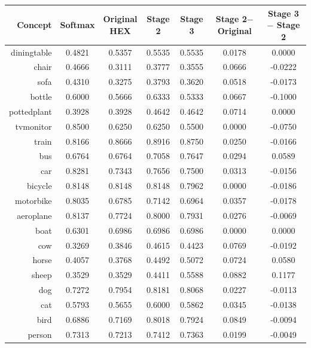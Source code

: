 \documentclass[11pt,a4paper]{article}
\begin{document}
\begin{table}[htbp]
\centering
\begin{tabular}{r|c|c|c|c|c|c}
Concept & Softmax & \makecell{Original\\HEX} & Stage 2 & Stage 3 & \makecell{Stage 2$-$\\Original} & \makecell{Stage 3$-$\\Stage 2}\\\hline
diningtable   & 0.4821 & 0.5357 & 0.5535 & 0.5535 & 0.0178 & 0.0000\\
chair         & 0.4666 & 0.3111 & 0.3777 & 0.3555 & 0.0666 & -0.0222\\
sofa          & 0.4310 & 0.3275 & 0.3793 & 0.3620 & 0.0518 & -0.0173\\
bottle        & 0.6000 & 0.5666 & 0.6333 & 0.5333 & 0.0667 & -0.1000\\
pottedplant   & 0.3928 & 0.3928 & 0.4642 & 0.4642 & 0.0714 & 0.0000\\
tvmonitor     & 0.8500 & 0.6250 & 0.6250 & 0.5500 & 0.0000 & -0.0750\\
train         & 0.8166 & 0.8666 & 0.8916 & 0.8750 & 0.0250 & -0.0166\\
bus           & 0.6764 & 0.6764 & 0.7058 & 0.7647 & 0.0294 & 0.0589\\
car           & 0.8281 & 0.7343 & 0.7656 & 0.7500 & 0.0313 & -0.0156\\
bicycle       & 0.8148 & 0.8148 & 0.8148 & 0.7962 & 0.0000 & -0.0186\\
motorbike     & 0.8035 & 0.6785 & 0.7142 & 0.6964 & 0.0357 & -0.0178\\
aeroplane     & 0.8137 & 0.7724 & 0.8000 & 0.7931 & 0.0276 & -0.0069\\
boat          & 0.6301 & 0.6986 & 0.6986 & 0.6986 & 0.0000 & 0.0000\\
cow           & 0.3269 & 0.3846 & 0.4615 & 0.4423 & 0.0769 & -0.0192\\
horse         & 0.4057 & 0.3768 & 0.4492 & 0.5072 & 0.0724 & 0.0580\\
sheep         & 0.3529 & 0.3529 & 0.4411 & 0.5588 & 0.0882 & 0.1177\\
dog           & 0.7272 & 0.7954 & 0.8181 & 0.8068 & 0.0227 & -0.0113\\
cat           & 0.5793 & 0.5655 & 0.6000 & 0.5862 & 0.0345 & -0.0138\\
bird          & 0.6886 & 0.7169 & 0.8018 & 0.7924 & 0.0849 & -0.0094\\
person        & 0.7313 & 0.7213 & 0.7412 & 0.7363 & 0.0199 & -0.0049\\\hline

\end{tabular}
\end{table}
\end{document}
